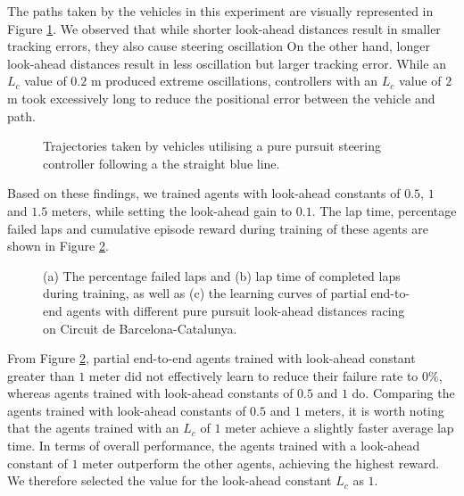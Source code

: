 The paths taken by the vehicles in this experiment are visually represented in Figure \ref{fig:lfc}. 
We observed that while shorter look-ahead distances result in smaller tracking errors, they also cause steering oscillation
On the other hand, longer look-ahead distances result in less oscillation but larger tracking error.
While an $L_c$ value of $0.2$ m produced extreme oscillations, controllers with an $L_c$ value of $2$ m took excessively long to reduce the positional error between the vehicle and path. 

\begin{figure}[htb!]
    \centering
    
    \caption[Tracjectories taken by vehicles following a straight line starting from an offset position]{Trajectories taken by vehicles utilising a pure pursuit steering controller following a the straight blue line.}
    \label{fig:lfc}
\end{figure}

Based on these findings, we trained agents with  look-ahead constants of $0.5$, $1$ and $1.5$ meters, while setting the look-ahead gain to $0.1$.
The lap time, percentage failed laps and cumulative episode reward during training of these agents are shown in Figure \ref{fig:lfc_curves}.

\begin{figure}[htb!]
    \centering
    
    \caption[Learning curves for tuning the steering controller look-ahead constant of a partial end-to-end agent]{(a) The percentage failed laps and (b) lap time of completed laps during training, as well as (c) the learning curves of partial end-to-end agents with different pure pursuit look-ahead distances racing on Circuit de Barcelona-Catalunya.}
    \label{fig:lfc_curves}
\end{figure}

From Figure \ref{fig:lfc_curves}, partial end-to-end agents trained with look-ahead constant greater than $1$ meter did not effectively learn to reduce their failure rate to $0\%$, whereas agents trained with  look-ahead constants of $0.5$ and $1$ do.
Comparing the agents trained with look-ahead constants of $0.5$ and $1$ meters, it is worth noting that the agents trained with an $L_c$ of $1$ meter achieve a slightly faster average lap time. 
In terms of overall performance, the agents trained with a look-ahead constant of $1$ meter outperform the other agents, achieving the highest reward.
We therefore selected the value for the look-ahead constant $L_c$ as $1$.


